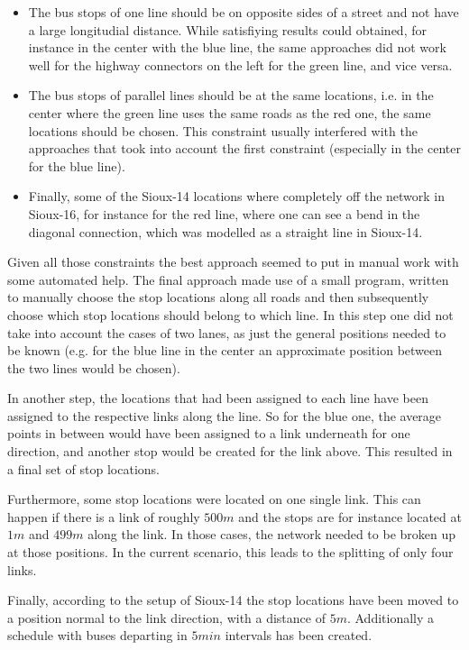 \begin{itemize}
\item The bus stops of one line should be on opposite sides of a street and not
have a large longitudial distance. While satisfiying results could obtained, for
instance in the center with the blue line, the same approaches did not work well
for the highway connectors on the left for the green line, and vice versa.
\item The bus stops of parallel lines should be at the same locations, i.e. in
the center where the green line uses the same roads as the red one, the same
locations should be chosen. This constraint usually interfered with the approaches
that took into account the first constraint (especially in the center for the
blue line).
\item Finally, some of the Sioux-14 locations where completely off the network in Sioux-16,
for instance for the red line, where one can see a bend in the diagonal connection,
which was modelled as a straight line in Sioux-14.
\end{itemize}

Given all those constraints the best approach seemed to put in manual work with
some automated help. The final approach made use of a small program, written to
manually choose the stop locations along all roads and then subsequently choose
which stop locations should belong to which line. In this step one did not take
into account the cases of two lanes, as just the general positions needed to be
known (e.g. for the blue line in the center an approximate position between the
two lines would be chosen).

In another step, the locations that had been assigned to each line have been
assigned to the respective links along the line. So for the blue one, the average
points in between would have been assigned to a link underneath for one direction,
and another stop would be created for the link above. This resulted in a final
set of stop locations.

Furthermore, some stop locations were located on one single link. This
can happen if there is a link of roughly $500m$ and the stops are for instance
located at $1m$ and $499m$ along the link. In those cases, the network needed to
be broken up at those positions. In the current scenario, this leads to the splitting
of only four links.

Finally, according to the setup of Sioux-14 the stop locations have been moved
to a position normal to the link direction, with a distance of $5m$. Additionally
a schedule with buses departing in $5min$ intervals has been created.

